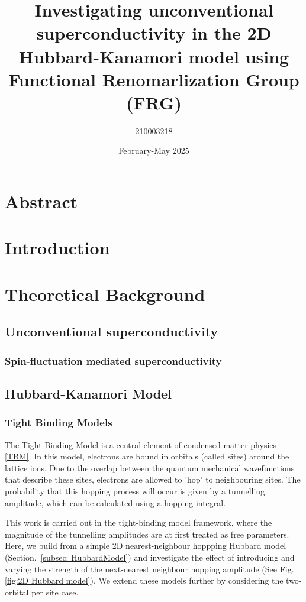 \documentclass[12pt]{article}
\title{Investigating unconventional superconductivity in the 2D Hubbard-Kanamori model using Functional Renomarlization Group (FRG)}
\author{210003218}
\date{February-May 2025}
\begin{document}
\maketitle
\tableofcontents 


\section{Abstract}

\section{Introduction}

\section{Theoretical Background}

\subsection{Unconventional superconductivity}



\subsubsection{Spin-fluctuation mediated superconductivity}

\subsection{Hubbard-Kanamori Model}

\subsubsection{Tight Binding Models}

The Tight Binding Model is a central element of condensed matter physics \eqref{TBM}. In this model, electrons are bound in orbitals (called sites) around the lattice ions.
Due to the overlap between the quantum mechanical wavefunctions that describe these sites, electrons are allowed to 'hop' to neighbouring sites. The probability that this hopping process will occur is given by a tunnelling amplitude, which can be calculated using a hopping integral. \par
\medskip
\noindent This work is carried out in the tight-binding model framework, where the magnitude of the tunnelling amplitudes are at first treated as free parameters. 
Here, we build from a simple 2D nearest-neighbour hoppping Hubbard model (Section.~\ref{subsec: HubbardModel}) and investigate the effect of introducing and varying the strength of the next-nearest neighbour hopping amplitude (See Fig. \ref{fig:2D Hubbard model}).
We extend these models further by considering the two-orbital per site case. 
\end{document}
